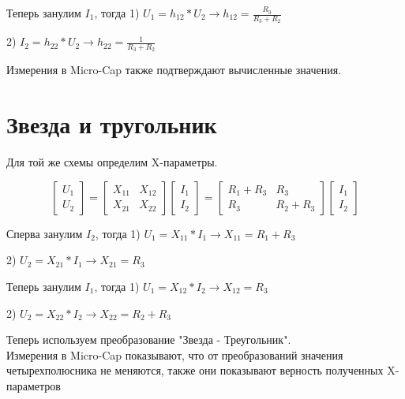 \documentclass[a4paper]{article}
\begin{document}
Теперь занулим $I_1$, тогда 1) $U_1 = h_{12} * U_2 \longrightarrow h_{12} = \frac{R_3}{R_3 + R_2}$ 

\hspace{4.05cm} 2) $I_2 = h_{22} * U_2 \longrightarrow h_{22} = \frac{1}{R_3 + R_2}$

Измерения в Micro-Cap также подтверждают вычисленные значения.

\newpage

\section{Звезда и тругольник}

Для той же схемы определим X-параметры.

\[  
\begin{bmatrix}
    U_1\\ 
    U_2 
\end{bmatrix}
 =
\begin{bmatrix}
    X_{11} & X_{12}\\ 
    X_{21} & X_{22}  
\end{bmatrix}
\begin{bmatrix}
    I_1\\ 
    I_2 
\end{bmatrix}
 =
\begin{bmatrix}
    R_1 + R_3 & R_3       \\ 
    R_3       & R_2 + R_3
\end{bmatrix}
\begin{bmatrix}
    I_1\\ 
    I_2 
\end{bmatrix}
\]

Сперва занулим $I_2$, тогда 1) $U_1 = X_{11} * I_1 \longrightarrow X_{11} = R_1 + R_3$ 

\hspace{4.10cm}             2) $U_2 = X_{21} * I_1 \longrightarrow X_{21} = R_3$
\vspace{0.3cm}

Теперь занулим $I_1$, тогда 1) $U_1 = X_{12} * I_2 \longrightarrow X_{12} = R_3$ 

\hspace{4.05cm}             2) $U_2 = X_{22} * I_2 \longrightarrow X_{22} = R_2 + R_3$
\vspace{0.3cm}

Теперь используем преобразование "Звезда - Треугольник". 
\\
Измерения в Micro-Cap показывают, что от преобразований значения четырехполюсника не меняются,
также они показывают верность полученных X-параметров
\end{document}
